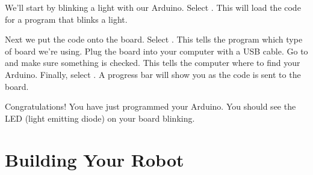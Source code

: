 \documentclass[letterpaper]{article}
\begin{document}
We'll start by blinking a light with our Arduino.
Select .
This will load the code for a program that blinks a light.

Next we put the code onto the board.
Select .
This tells the program which type of board we're using.
Plug the board into your computer with a USB cable.
Go to  and make sure something is checked.
This tells the computer where to find your Arduino.
Finally, select .
A progress bar will show you as the code is sent to the board.

Congratulations!
You have just programmed your Arduino.
You should see the LED (light emitting diode) on your board blinking.

\section{Building Your Robot}
\label{sec:wiring_your_robot}



\clearpage


\end{document}
